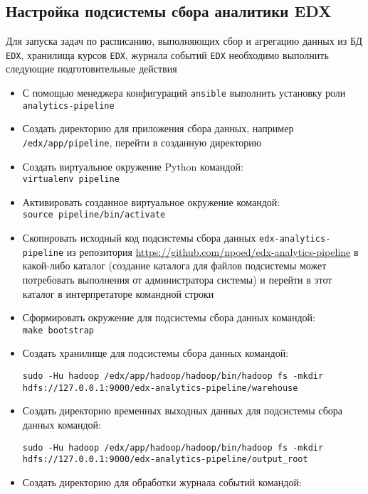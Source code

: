 \subsection{Настройка подсистемы сбора аналитики EDX}
Для запуска задач по расписанию, выполняющих сбор и агрегацию данных из БД \texttt{EDX}, хранилища курсов \texttt{EDX}, журнала событий \texttt{EDX} необходимо выполнить следующие подготовительные действия
\begin{itemize}
	\item С помощью менеджера конфигураций \texttt{ansible} выполнить установку роли \texttt{analytics-pipeline}
	\item Создать директорию для приложения сбора данных, например \texttt{/edx/app/pipeline}, перейти в созданную директорию
	\item Создать виртуальное окружение Python командой:\\
		\texttt{virtualenv pipeline}
	\item Активировать созданное виртуальное окружение командой:\\
		\texttt{source pipeline/bin/activate}
	\item Скопировать исходный код подсистемы сбора данных \texttt{edx-analytics-pipeline} из репозитория \url{https://github.com/npoed/edx-analytics-pipeline} в какой-либо каталог (создание каталога для файлов подсистемы может потребовать выполнения от администратора системы) и перейти в этот каталог в интерпретаторе командной строки
	\item Сформировать окружение для подсистемы сбора данных командой:\\
		\texttt{make bootstrap}
	\item Создать хранилище для подсистемы сбора данных командой:\\
	\begin{sloppypar}
		\texttt{sudo -Hu hadoop /edx/app/hadoop/hadoop/bin/hadoop fs -mkdir hdfs://127.0.0.1:9000/edx-analytics-pipeline/warehouse}		
	\end{sloppypar}
	\item Создать директорию временных выходных данных для подсистемы сбора данных командой:\\
	\begin{sloppypar}
		\texttt{sudo -Hu hadoop /edx/app/hadoop/hadoop/bin/hadoop fs -mkdir hdfs://127.0.0.1:9000/edx-analytics-pipeline/output\_root}		
	\end{sloppypar}
	\item Создать директорию для обработки журнала событий командой:\\

\end{itemize}
